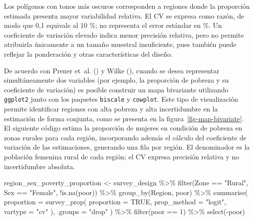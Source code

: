 \documentclass[
  spanish,
  11pt,
  letterpaper,
  oneside,
  open=any]{scrbook}
\newenvironment{Shaded}{\begin{snugshade}}{\end{snugshade}}
\newcommand{\AttributeTok}[1]{\textcolor[rgb]{0.40,0.45,0.13}{#1}}
\newcommand{\ConstantTok}[1]{\textcolor[rgb]{0.56,0.35,0.01}{#1}}
\newcommand{\DecValTok}[1]{\textcolor[rgb]{0.68,0.00,0.00}{#1}}
\newcommand{\FunctionTok}[1]{\textcolor[rgb]{0.28,0.35,0.67}{#1}}
\newcommand{\NormalTok}[1]{\textcolor[rgb]{0.00,0.23,0.31}{#1}}
\newcommand{\OtherTok}[1]{\textcolor[rgb]{0.00,0.23,0.31}{#1}}
\newcommand{\SpecialCharTok}[1]{\textcolor[rgb]{0.37,0.37,0.37}{#1}}
\newcommand{\StringTok}[1]{\textcolor[rgb]{0.13,0.47,0.30}{#1}}
\begin{document}
Los polígonos con tonos más oscuros corresponden a regiones donde la
proporción estimada presenta mayor variabilidad relativa. El CV se
expresa como razón, de modo que 0,1 equivale al 10 \%; no representa el
error estándar en \%. Un coeficiente de variación elevado indica menor
precisión relativa, pero no permite atribuirla únicamente a un tamaño
muestral insuficiente, pues también puede reflejar la ponderación y
otras características del diseño.

De acuerdo con Prener et~al. () y Wilke
(), cuando se desea representar
simultáneamente dos variables (por ejemplo, la proporción de pobreza y
su coeficiente de variación) es posible construir un mapa bivariante
utilizando \texttt{ggplot2} junto con los paquetes \texttt{biscale} y
\texttt{cowplot}. Este tipo de visualización permite identificar
regiones con alta pobreza y alta incertidumbre en la estimación de forma
conjunta, como se presenta en la figura~\ref{fig-map-bivariate}. El
siguiente código estima la proporción de mujeres en condición de pobreza
en zonas rurales para cada región, incorporando además el cálculo del
coeficiente de variación de las estimaciones, generando una fila por
región. El denominador es la población femenina rural de cada región; el
CV expresa precisión relativa y no incertidumbre absoluta.

\begin{Shaded}
\begin{Highlighting}[]
\NormalTok{region\_sex\_poverty\_proportion }\OtherTok{\textless{}{-}}\NormalTok{ survey\_design }\SpecialCharTok{\%\textgreater{}\%}
  \FunctionTok{filter}\NormalTok{(Zone }\SpecialCharTok{==} \StringTok{"Rural"}\NormalTok{, Sex }\SpecialCharTok{==} \StringTok{"Female"}\NormalTok{, }\SpecialCharTok{!}\FunctionTok{is.na}\NormalTok{(poor)) }\SpecialCharTok{\%\textgreater{}\%}
  \FunctionTok{group\_by}\NormalTok{(Region, poor) }\SpecialCharTok{\%\textgreater{}\%}
  \FunctionTok{summarise}\NormalTok{(}
    \AttributeTok{proportion =} \FunctionTok{survey\_prop}\NormalTok{(}
      \AttributeTok{proportion =} \ConstantTok{TRUE}\NormalTok{,}
      \AttributeTok{prop\_method =} \StringTok{"logit"}\NormalTok{,}
      \AttributeTok{vartype =} \StringTok{"cv"}
\NormalTok{    ),}
    \AttributeTok{.groups =} \StringTok{"drop"}
\NormalTok{  ) }\SpecialCharTok{\%\textgreater{}\%}
  \FunctionTok{filter}\NormalTok{(poor }\SpecialCharTok{==} \DecValTok{1}\NormalTok{) }\SpecialCharTok{\%\textgreater{}\%}
  \FunctionTok{select}\NormalTok{(}\SpecialCharTok{{-}}\NormalTok{poor)}
\end{Highlighting}
\end{Shaded}
\end{document}
